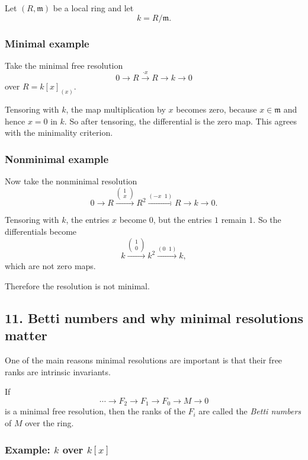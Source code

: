 \documentclass[12pt,a4paper]{article}
\theoremstyle{notespace}
\theoremstyle{definition}
\begin{document}
Let \((R,\mathfrak m)\) be a local ring and let
\[
k=R/\mathfrak m.
\]

\subsubsection*{Minimal example}

Take the minimal free resolution
\[
0 \longrightarrow R \xrightarrow{\cdot x} R \longrightarrow k \longrightarrow 0
\]
over \(R=k[x]_{(x)}\).

Tensoring with \(k\), the map multiplication by \(x\) becomes zero, because \(x\in \mathfrak m\) and hence \(x=0\) in \(k\).
So after tensoring, the differential is the zero map.
This agrees with the minimality criterion.

\subsubsection*{Nonminimal example}

Now take the nonminimal resolution
\[
0 \longrightarrow R \xrightarrow{\begin{pmatrix}1\\x\end{pmatrix}} R^2
\xrightarrow{(-x\;\;1)} R \longrightarrow k \longrightarrow 0.
\]

Tensoring with \(k\), the entries \(x\) become \(0\), but the entries \(1\) remain \(1\).
So the differentials become
\[
k \xrightarrow{\begin{pmatrix}1\\0\end{pmatrix}} k^2
\xrightarrow{(0\;\;1)} k,
\]
which are not zero maps.

Therefore the resolution is not minimal.

\subsection{11. Betti numbers and why minimal resolutions matter}

One of the main reasons minimal resolutions are important is that their free ranks are intrinsic invariants.

If
\[
\cdots \longrightarrow F_2 \longrightarrow F_1 \longrightarrow F_0 \longrightarrow M \longrightarrow 0
\]
is a minimal free resolution, then the ranks of the \(F_i\) are called the \emph{Betti numbers} of \(M\) over the ring.

\subsubsection*{Example: \(k\) over \(k[x]\)}
\end{document}
